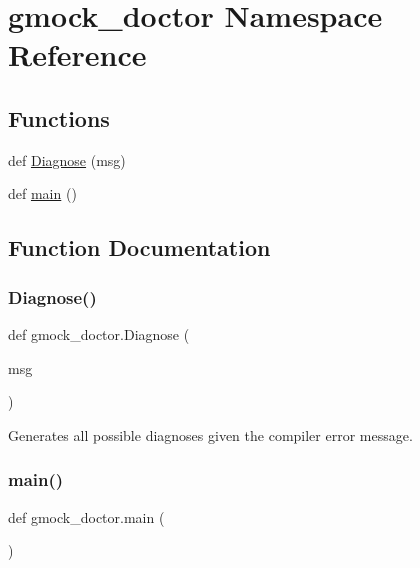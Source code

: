 \hypertarget{namespacegmock__doctor}{}\section{gmock\+\_\+doctor Namespace Reference}
\label{namespacegmock__doctor}
\subsection*{Functions}
\begin{DoxyCompactItemize}
\item 
def \hyperlink{namespacegmock__doctor_a8b791ed6679a0135862ebb3e8c27b2b4}{Diagnose} (msg)
\item 
def \hyperlink{namespacegmock__doctor_a6eb6c47cf5a3a7c4266f473c0af6b82f}{main} ()
\end{DoxyCompactItemize}


\subsection{Function Documentation}
\mbox{\label{namespacegmock__doctor_a8b791ed6679a0135862ebb3e8c27b2b4}} 
\subsubsection{\texorpdfstring{Diagnose()}{Diagnose()}}
{\footnotesize\ttfamily def gmock\+\_\+doctor.\+Diagnose (\begin{DoxyParamCaption}\item[{}]{msg }\end{DoxyParamCaption})}

\begin{DoxyVerb}Generates all possible diagnoses given the compiler error message.\end{DoxyVerb}
 \mbox{\label{namespacegmock__doctor_a6eb6c47cf5a3a7c4266f473c0af6b82f}} 
\subsubsection{\texorpdfstring{main()}{main()}}
{\footnotesize\ttfamily def gmock\+\_\+doctor.\+main (\begin{DoxyParamCaption}{ }\end{DoxyParamCaption})}

